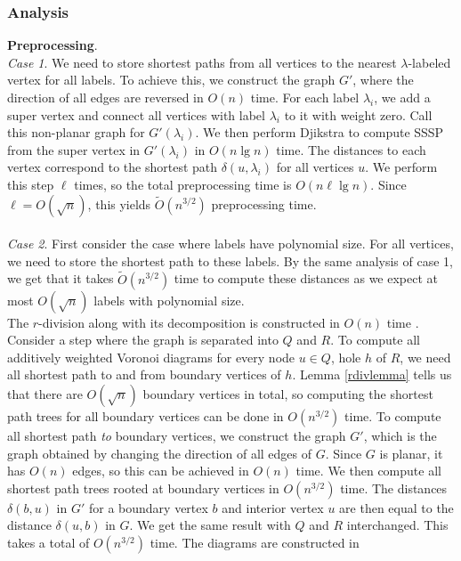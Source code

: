 \subsubsection{Analysis}\label{oracle2analysis}
\textbf{Preprocessing}. \\
\textit{Case 1}. We need to store shortest paths from all vertices to the nearest
$\lambda$-labeled vertex for all labels. To achieve this, we construct the graph $G'$, where the
direction of all edges are reversed in $O(n)$ time. For each label $\lambda_i$, we add a
super vertex and connect all vertices with label $\lambda_i$ to it with weight zero. Call this non-planar
graph for $G'(\lambda_i)$. We then perform Djikstra
\cite{fredman1987fibonacci} to compute SSSP from the super vertex in $G'(\lambda_i)$ in
$O(n\lg n)$ time. The distances to each vertex correspond to the shortest path
$\delta(u,\lambda_i)$ for all vertices $u$. We perform this step $\ell$
times, so the total preprocessing time is $O(n\ell \lg n)$. Since $\ell=O(\sqrt{n})$, this
yields $\tilde{O}(n^{3/2})$ preprocessing time. \\
\\
\textit{Case 2}. First consider the case where labels have polynomial size. For all
vertices, we need to store the shortest path to these labels. By the same analysis of case 1,
we get that it takes $\tilde{O}(n^{3/2})$ time to compute these distances as we expect at
most $O(\sqrt{n})$ labels with polynomial size. \\
The $r$-division along with its decomposition is constructed in $O(n)$
time \cite{klein2013structured}. Consider a step where the graph is separated into $Q$
and $R$. To compute all additively weighted Voronoi diagrams for every node $u\in
Q$, hole $h$ of $R$, we need all
shortest path to and from boundary vertices of $h$. Lemma \ref{rdivlemma} tells us that there are
$O(\sqrt{n})$ boundary vertices in total, so computing the shortest path trees for all
boundary vertices can be done in $O(n^{3/2})$ time. To compute all shortest path \textit{to} boundary vertices, we construct the graph
$G'$, which is the graph obtained by changing the direction of all edges of $G$. Since
$G$ is planar, it has $O(n)$ edges, so this can be achieved in $O(n)$ time. We then
compute all shortest path trees rooted at boundary vertices in $O(n^{3/2})$ time. The
distances $\delta(b,u)$ in $G'$ for a boundary vertex $b$ and interior vertex $u$ are then equal
to the distance $\delta(u,b)$ in $G$. We get the same result with $Q$ and $R$
interchanged. This takes a total of $O(n^{3/2})$ time. The diagrams are constructed in
